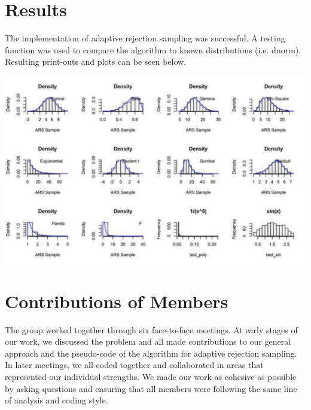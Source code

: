 \documentclass{article}\usepackage[]{graphicx}\usepackage[]{color}
\begin{document}
\begin{titlepage}
\begin{center}
\end{center}
\end{titlepage}

\newpage
\section{Results}
The implementation of adaptive rejection sampling was successful.  A testing function was used to compare the algorithm to known distributions (i.e. dnorm).  Resulting print-outs and plots can be seen below.

\includegraphics{12_Sampling_90per.pdf}


\section{Contributions of Members}
The group worked together through six face-to-face meetings.  At early stages of our work, we discussed the problem and all made contributions to our general approach and the pseudo-code of the algorithm for adaptive rejection sampling.  In later meetings, we all coded together and collaborated in areas that represented our individual strengths.  We made our work as cohesive as possible by asking questions and ensuring that all members were following the same line of analysis and coding style.
\end{document}

